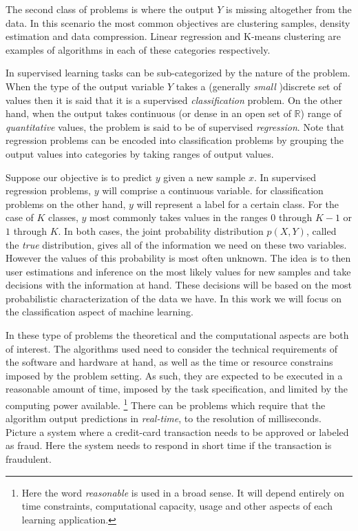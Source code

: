 The second class of problems is where the output $Y$ is missing altogether from the data. In this scenario the most common objectives are clustering samples, density estimation and data compression. Linear regression and K-means clustering are examples of algorithms in each of these categories respectively.

In supervised learning tasks can be sub-categorized by the nature of the problem. When the type of the output variable $Y$ takes a (generally \textit{small} )discrete set of values then it is said that it is a supervised \textit{classification} problem. On the other hand, when the output takes continuous (or dense in an open set of $\mathbb{R}$) range of \textit{quantitative} values, the problem is said to be of supervised \textit{regression}. Note that regression problems can be encoded into classification problems by grouping the output values into categories by taking ranges of output values. 

Suppose our objective is to predict $y$ given a new sample $x$. In supervised regression problems, $y$ will comprise a continuous variable. for classification problems on the other hand, $y$ will represent a label for a certain class. For the case of $K$ classes, $y$ most commonly takes values in the ranges $0$ through $K-1$  or $1$ through $K$. In both cases, the joint probability distribution $p(X, Y)$, called the \textit{true} distribution, gives all of the information we need on these two variables. However the values of this probability is most often unknown. The idea is to then user estimations and inference on the most likely values for new samples and take decisions with the information at hand. These decisions will be based on the most probabilistic characterization of the data we have. In this work we will focus on the classification aspect of machine learning.

In these type of problems the theoretical and the computational aspects are both of interest. The algorithms used need to consider the technical requirements of the software and hardware at hand, as well as the time or resource constrains imposed by the problem setting. As such, they are expected to be executed in a reasonable amount of time, imposed by the task specification, and limited by the computing power available. \footnote{Here the word \textit{reasonable} is used in a broad sense. It will depend entirely on time constraints, computational capacity, usage and other aspects of each learning application.} There can be  problems which require that the algorithm output predictions in \textit{real-time}, to the resolution of milliseconds. Picture a system where a credit-card transaction needs to be approved or labeled as fraud. Here the system needs to respond in short time if the transaction is fraudulent. 

